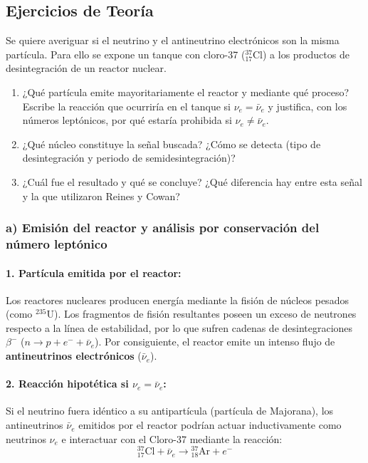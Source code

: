 \subsection{Ejercicios de Teoría}
\begin{problema}
Se quiere averiguar si el neutrino y el antineutrino electrónicos son la misma partícula. Para ello se expone un tanque con cloro-37 (${}^{37}_{17}\text{Cl}$) a los productos de desintegración de un reactor nuclear.

\begin{enumerate}[label=\alph*)]
    \item ¿Qué partícula emite mayoritariamente el reactor y mediante qué proceso? Escribe la reacción que ocurriría en el tanque si $\nu_e = \bar{\nu}_e$ y justifica, con los números leptónicos, por qué estaría prohibida si $\nu_e \neq \bar{\nu}_e$.
    \item ¿Qué núcleo constituye la señal buscada? ¿Cómo se detecta (tipo de desintegración y periodo de semidesintegración)?
    \item ¿Cuál fue el resultado y qué se concluye? ¿Qué diferencia hay entre esta señal y la que utilizaron Reines y Cowan?
\end{enumerate}

\tcblower

\subsubsection*{a) Emisión del reactor y análisis por conservación del número leptónico}

\paragraph{1. Partícula emitida por el reactor:}
Los reactores nucleares producen energía mediante la fisión de núcleos pesados (como ${}^{235}\text{U}$). Los fragmentos de fisión resultantes poseen un exceso de neutrones respecto a la línea de estabilidad, por lo que sufren cadenas de desintegraciones $\beta^-$ ($n \rightarrow p + e^- + \bar{\nu}_e$). Por consiguiente, el reactor emite un intenso flujo de \textbf{antineutrinos electrónicos} ($\bar{\nu}_e$).

\paragraph{2. Reacción hipotética si $\nu_e = \bar{\nu}_e$:}
Si el neutrino fuera idéntico a su antipartícula (partícula de Majorana), los antineutrinos $\bar{\nu}_e$ emitidos por el reactor podrían actuar inductivamente como neutrinos $\nu_e$ e interactuar con el Cloro-37 mediante la reacción:
\begin{equation*}
{}^{37}_{17}\text{Cl} + \bar{\nu}_e \longrightarrow {}^{37}_{18}\text{Ar} + e^-
\end{equation*}


\end{problema}
